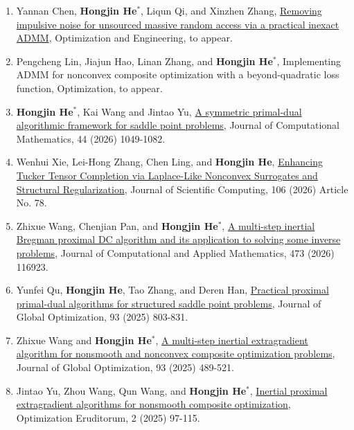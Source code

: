 \begin{enumerate}
	
	\item Yannan Chen, {\bf Hongjin He}$^*$, Liqun Qi, and Xinzhen Zhang, \href{https://doi.org/10.1007/s11081-025-09998-5}{Removing impulsive noise for unsourced massive random access via a practical inexact ADMM}, Optimization and Engineering, to appear. 
	
	\item Pengcheng Lin, Jiajun Hao, Linan Zhang, and {\bf Hongjin He}$^*$,  Implementing ADMM for nonconvex composite optimization with a beyond-quadratic loss function, Optimization, to appear.	
	
	\item {\bf Hongjin He}$^*$, Kai Wang and Jintao Yu, \href{https://journal.global-sci.org/intro/online/read?online_id=2829}{\color{blue}A symmetric primal-dual algorithmic framework for saddle point problems}, Journal of Computational Mathematics, 44 (2026) 1049-1082.
	
	\item Wenhui Xie, Lei-Hong Zhang, Chen Ling, and {\bf Hongjin He}, \href{https://doi.org/10.1007/s10915-026-03205-y}{Enhancing Tucker Tensor Completion via Laplace-Like Nonconvex Surrogates and Structural Regularization}, Journal of Scientific Computing, 106 (2026) Article No. 78.
	
	\item Zhixue Wang, Chenjian Pan, and {\bf Hongjin He}$^*$,  \href{https://www.sciencedirect.com/science/article/abs/pii/S0377042725004376}{A multi-step inertial Bregman proximal DC algorithm and its application to solving some inverse problems}, Journal of Computational and Applied Mathematics, 473 (2026) 116923.
		
	\item Yunfei Qu, {\bf Hongjin He}, Tao Zhang, and Deren Han, \href{https://doi.org/10.1007/s10898-025-01545-x}{Practical proximal primal-dual algorithms for structured saddle point problems},  Journal of Global Optimization, 93 (2025) 803-831.
	
	\item Zhixue Wang and {\bf Hongjin He}$^*$, \href{https://doi.org/10.1007/s10898-025-01532-2}{\color{blue}A multi-step inertial extragradient algorithm for nonsmooth and nonconvex composite optimization problems}, Journal of Global Optimization, 93 (2025) 489-521.
	
	\item Jintao Yu, Zhou Wang, Qun Wang, and {\bf Hongjin He}$^*$, \href{https://doi.org/10.69829/oper-025-0202-ta02}{Inertial proximal extragradient algorithms for nonsmooth composite optimization}, Optimization Eruditorum, 2 (2025) 97-115.
		

\end{enumerate}
